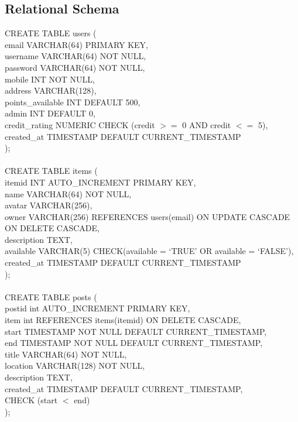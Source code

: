\subsection{Relational Schema}
CREATE TABLE users (\\
email VARCHAR(64) PRIMARY KEY,\\
username VARCHAR(64) NOT NULL,\\
password VARCHAR(64) NOT NULL,\\
mobile INT NOT NULL,\\
address VARCHAR(128), \\
points\_available INT DEFAULT 500,\\
admin INT DEFAULT 0,\\
credit\_rating NUMERIC CHECK (credit $>=$ 0 AND credit $<=$ 5),\\
created\_at TIMESTAMP DEFAULT CURRENT\_TIMESTAMP\\
);\\\\
CREATE TABLE items (\\
itemid INT AUTO\_INCREMENT PRIMARY KEY,\\
name VARCHAR(64) NOT NULL,\\
avatar VARCHAR(256),\\
owner VARCHAR(256) REFERENCES users(email) ON UPDATE CASCADE ON DELETE CASCADE,\\
description TEXT,\\
available VARCHAR(5) CHECK(available = `TRUE' OR available = `FALSE'),\\
created\_at TIMESTAMP DEFAULT CURRENT\_TIMESTAMP\\
);\\\\
CREATE TABLE posts (\\
postid int AUTO\_INCREMENT PRIMARY KEY,\\
item int REFERENCES items(itemid) ON DELETE CASCADE,\\
start TIMESTAMP NOT NULL DEFAULT CURRENT\_TIMESTAMP,\\
end TIMESTAMP NOT NULL DEFAULT CURRENT\_TIMESTAMP, \\
title VARCHAR(64) NOT NULL,\\
location VARCHAR(128) NOT NULL,\\
description TEXT,\\
created\_at TIMESTAMP DEFAULT CURRENT\_TIMESTAMP,\\
CHECK (start $<$ end)\\
);\\\\
